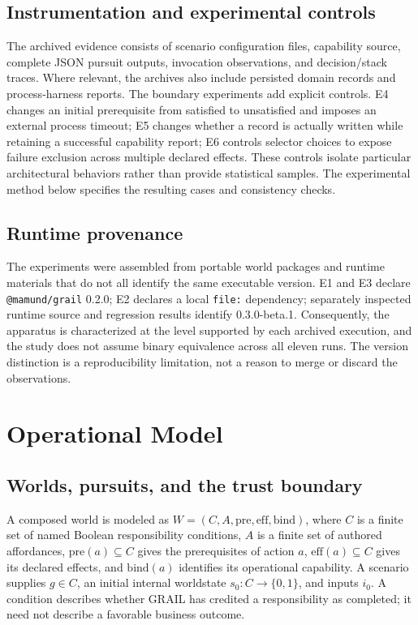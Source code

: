 \documentclass[11pt]{article}
\begin{document}
\subsection{Instrumentation and experimental controls}
The archived evidence consists of scenario configuration files, capability source, complete JSON pursuit outputs, invocation observations, and decision/stack traces. Where relevant, the archives also include persisted domain records and process-harness reports. The boundary experiments add explicit controls. E4 changes an initial prerequisite from satisfied to unsatisfied and imposes an external process timeout; E5 changes whether a record is actually written while retaining a successful capability report; E6 controls selector choices to expose failure exclusion across multiple declared effects. These controls isolate particular architectural behaviors rather than provide statistical samples. The experimental method below specifies the resulting cases and consistency checks.

\subsection{Runtime provenance}
The experiments were assembled from portable world packages and runtime materials that do not all identify the same executable version. E1 and E3 declare \texttt{@mamund/grail} 0.2.0; E2 declares a local \texttt{file:} dependency; separately inspected runtime source and regression results identify 0.3.0-beta.1. Consequently, the apparatus is characterized at the level supported by each archived execution, and the study does not assume binary equivalence across all eleven runs. The version distinction is a reproducibility limitation, not a reason to merge or discard the observations.
\section{Operational Model}
\subsection{Worlds, pursuits, and the trust boundary}
A composed world is modeled as $W=(C,A,\mathrm{pre},\mathrm{eff},\mathrm{bind})$, where $C$ is a finite set of named Boolean responsibility conditions, $A$ is a finite set of authored affordances, $\mathrm{pre}(a)\subseteq C$ gives the prerequisites of action $a$, $\mathrm{eff}(a)\subseteq C$ gives its declared effects, and $\mathrm{bind}(a)$ identifies its operational capability. A scenario supplies $g\in C$, an initial internal worldstate $s_0:C\rightarrow\{0,1\}$, and inputs $i_0$. A condition describes whether GRAIL has credited a responsibility as completed; it need not describe a favorable business outcome.
\end{document}
